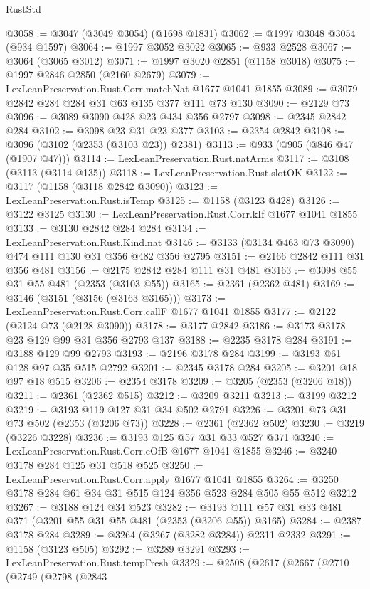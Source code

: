 \begin{lexlean}{RustStd}
\begin{coremodule}
@3058 := @3047 (@3049 @3054) (@1698 @1831)
@3062 := @1997 @3048 @3054 (@934 @1597)
@3064 := @1997 @3052 @3022
@3065 := @933 @2528
@3067 := @3064 (@3065 @3012)
@3071 := @1997 @3020 @2851 (@1158 @3018)
@3075 := @1997 @2846 @2850 (@2160 @2679)
@3079 := LexLeanPreservation.Rust.Corr.matchNat @1677 @1041 @1855
@3089 := @3079 @2842 @284 @284 @31 @63 @135 @377 @111 @73 @130
@3090 := @2129 @73
@3096 := @3089 @3090 @428 @23 @434 @356 @2797
@3098 := @2345 @2842 @284
@3102 := @3098 @23 @31 @23 @377
@3103 := @2354 @2842
@3108 := @3096 (@3102 (@2353 (@3103 @23)) @2381)
@3113 := @933 (@905 (@846 @47 (@1907 @47)))
@3114 := LexLeanPreservation.Rust.natArms
@3117 := @3108 (@3113 (@3114 @135))
@3118 := LexLeanPreservation.Rust.slotOK
@3122 := @3117 (@1158 (@3118 @2842 @3090))
@3123 := LexLeanPreservation.Rust.isTemp
@3125 := @1158 (@3123 @428)
@3126 := @3122 @3125
@3130 := LexLeanPreservation.Rust.Corr.kIf @1677 @1041 @1855
@3133 := @3130 @2842 @284 @284
@3134 := LexLeanPreservation.Rust.Kind.nat
@3146 := @3133 (@3134 @463 @73 @3090) @474 @111 @130 @31 @356 @482 @356 @2795
@3151 := @2166 @2842 @111 @31 @356 @481
@3156 := @2175 @2842 @284 @111 @31 @481
@3163 := @3098 @55 @31 @55 @481 (@2353 (@3103 @55))
@3165 := @2361 (@2362 @481)
@3169 := @3146 (@3151 (@3156 (@3163 @3165)))
@3173 := LexLeanPreservation.Rust.Corr.callF @1677 @1041 @1855
@3177 := @2122 (@2124 @73 (@2128 @3090))
@3178 := @3177 @2842
@3186 := @3173 @3178 @23 @129 @99 @31 @356 @2793 @137
@3188 := @2235 @3178 @284
@3191 := @3188 @129 @99 @2793
@3193 := @2196 @3178 @284
@3199 := @3193 @61 @128 @97 @35 @515 @2792
@3201 := @2345 @3178 @284
@3205 := @3201 @18 @97 @18 @515
@3206 := @2354 @3178
@3209 := @3205 (@2353 (@3206 @18))
@3211 := @2361 (@2362 @515)
@3212 := @3209 @3211
@3213 := @3199 @3212
@3219 := @3193 @119 @127 @31 @34 @502 @2791
@3226 := @3201 @73 @31 @73 @502 (@2353 (@3206 @73))
@3228 := @2361 (@2362 @502)
@3230 := @3219 (@3226 @3228)
@3236 := @3193 @125 @57 @31 @33 @527 @371
@3240 := LexLeanPreservation.Rust.Corr.eOfB @1677 @1041 @1855
@3246 := @3240 @3178 @284 @125 @31 @518 @525
@3250 := LexLeanPreservation.Rust.Corr.apply @1677 @1041 @1855
@3264 := @3250 @3178 @284 @61 @34 @31 @515 @124 @356 @523 @284 @505 @55 @512 @3212
@3267 := @3188 @124 @34 @523
@3282 := @3193 @111 @57 @31 @33 @481 @371 (@3201 @55 @31 @55 @481 (@2353 (@3206 @55)) @3165)
@3284 := @2387 @3178 @284
@3289 := @3264 (@3267 (@3282 @3284)) @2311 @2332
@3291 := @1158 (@3123 @505)
@3292 := @3289 @3291
@3293 := LexLeanPreservation.Rust.tempFresh
@3329 := @2508
    (@2617
      (@2667
        (@2710
          (@2749
            (@2798
              (@2843

\end{coremodule}
\end{lexlean}

